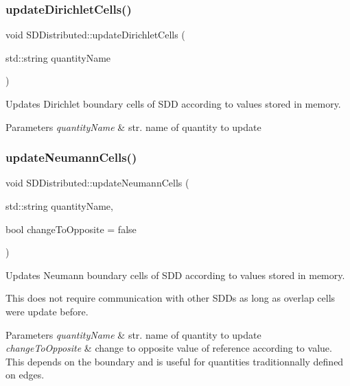 \subsubsection{\texorpdfstring{update\+Dirichlet\+Cells()}{updateDirichletCells()}}
{\footnotesize\ttfamily void S\+D\+Distributed\+::update\+Dirichlet\+Cells (\begin{DoxyParamCaption}\item[{std\+::string}]{quantity\+Name }\end{DoxyParamCaption})}



Updates Dirichlet boundary cells of S\+DD according to values stored in memory. 


\begin{DoxyParams}{Parameters}
{\em quantity\+Name} & str. name of quantity to update \\
\hline
\end{DoxyParams}
\mbox{\label{classSDDistributed_a492c6799b5b1f79481a2ee6e50979a18}} 
\subsubsection{\texorpdfstring{update\+Neumann\+Cells()}{updateNeumannCells()}}
{\footnotesize\ttfamily void S\+D\+Distributed\+::update\+Neumann\+Cells (\begin{DoxyParamCaption}\item[{std\+::string}]{quantity\+Name,  }\item[{bool}]{change\+To\+Opposite = {\ttfamily false} }\end{DoxyParamCaption})}



Updates Neumann boundary cells of S\+DD according to values stored in memory. 

This does not require communication with other S\+D\+Ds as long as overlap cells were update before.


\begin{DoxyParams}{Parameters}
{\em quantity\+Name} & str. name of quantity to update \\
\hline
{\em change\+To\+Opposite} & change to opposite value of reference according to value. This depends on the boundary and is useful for quantities traditionnally defined on edges. \\
\hline
\end{DoxyParams}
\mbox{\label{classSDDistributed_a467f8c05c2cf7728828ec9d0c617e667}} 
